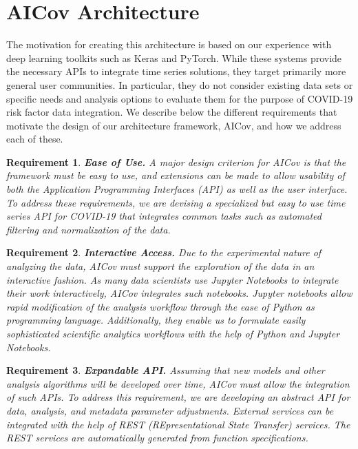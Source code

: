 \documentclass[letterpaper, inpress]{jds} %
\renewcommand{\_}{%
    \textunderscore\hspace{0pt}%
}
\newtheorem{requirement}{Requirement}
\begin{document}
\section{AICov Architecture}
\label{sec:arch}

The motivation for creating this architecture is based on our
experience with deep learning toolkits such as Keras and
PyTorch. While these systems provide the necessary APIs to integrate
time series solutions, they target primarily more general user
communities. In particular, they do not consider existing data sets or
specific needs and analysis options to evaluate them for the purpose
of COVID-19 risk factor data integration. We describe below the
different requirements that motivate the design of our architecture
framework, AICov, and how we address each of these.

\newcommand{\Solution}{}

\begin{requirement}{\bf Ease of Use.} \normalfont
  A major design criterion for AICov is that the framework must be
  easy to use, and extensions can be made to allow usability of both
  the Application Programming Interfaces (API) as well as the user
  interface. \Solution To address these requirements, we are devising
  a specialized but easy to use time series API for COVID-19 that
  integrates common tasks such as automated filtering and
  normalization of the data.
\end{requirement}


\begin{requirement}{\bf Interactive Access.} \normalfont
  Due to the experimental nature of analyzing the data, AICov must
  support the exploration of the data in an interactive
  fashion. \Solution As many data scientists use Jupyter Notebooks to
  integrate their work interactively, AICov integrates such
  notebooks. Jupyter notebooks allow rapid modification of the
  analysis workflow through the ease of Python as programming
  language. Additionally, they enable us to formulate easily
  sophisticated scientific analytics workflows with the help of
  Python and Jupyter Notebooks.
\end{requirement}


\begin{requirement}{\bf Expandable API.} \normalfont
  Assuming that new models and other analysis algorithms will be
  developed over time, AICov must allow the integration of such
  APIs. \Solution To address this requirement, we are developing an
  abstract API for data, analysis, and metadata parameter
  adjustments. External services can be integrated with the help of
  REST (REpresentational State Transfer) services. The REST services
  are automatically generated from function specifications.
\end{requirement}
\end{document}
